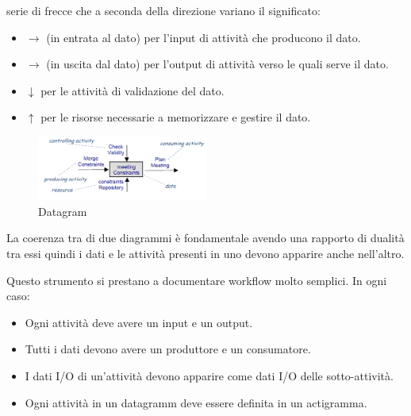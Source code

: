 \begin{enumerate}
            serie di frecce che a seconda della direzione variano il significato:
            \begin{itemize}
                  \item $\to$ (in entrata al dato) per l'input di attività che
                        producono il dato.
                  \item $\to$ (in uscita dal dato) per l'output di attività verso
                        le quali serve il dato.
                  \item $\downarrow$ per le attività di validazione del dato.
                  \item $\uparrow$ per le risorse necessarie a memorizzare e
                        gestire il dato.
            \end{itemize}
            \begin{figure}[!ht]
                  \centering
                  \includegraphics[width=0.5\textwidth]{img/requirements/datagram.png}
                  \caption{Datagram}
                  \label{fig:datagram}
            \end{figure}
\end{enumerate}
La coerenza tra di due diagrammi è fondamentale avendo una rapporto di dualità
tra essi quindi i dati e le attività presenti in uno devono apparire anche
nell'altro.

Questo strumento si prestano a documentare workflow molto semplici. In ogni caso:
\begin{itemize}
      \item Ogni attività deve avere un input e un output.
      \item Tutti i dati devono avere un produttore e un consumatore.
      \item I dati I/O di un'attività devono apparire come dati I/O delle
            sotto-attività.
      \item Ogni attività in un datagramm deve essere definita in un actigramma.
\end{itemize}
